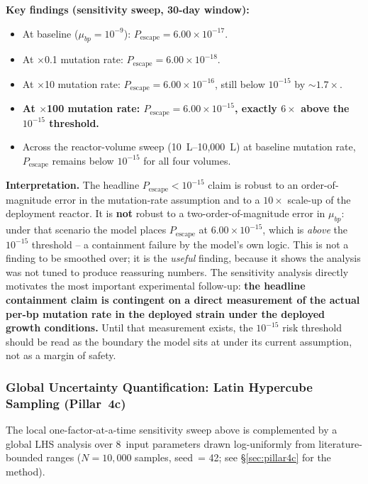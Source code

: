 \documentclass[10pt,twocolumn,letterpaper,
              colorlinks=true,
              linkcolor=blue!70!black,
              citecolor=blue!70!black,
              urlcolor=blue!70!black,
              pdfborder={0 0 0}]{article}
\begin{document}
\textbf{Key findings (sensitivity sweep, 30-day window):}
\begin{itemize}
  \item At baseline ($\mu_{bp} = 10^{-9}$):
        $P_{\text{escape}} = 6.00 \times 10^{-17}$.
  \item At $\times$0.1 mutation rate:
        $P_{\text{escape}} = 6.00 \times 10^{-18}$.
  \item At $\times$10 mutation rate:
        $P_{\text{escape}} = 6.00 \times 10^{-16}$,
        still below $10^{-15}$ by $\sim$$1.7\times$.
  \item \textbf{At $\times$100 mutation rate:
        $P_{\text{escape}} = 6.00 \times 10^{-15}$,
        exactly $6\times$ above the $10^{-15}$ threshold.}
  \item Across the reactor-volume sweep (10~L--10{,}000~L) at baseline
        mutation rate, $P_{\text{escape}}$ remains below $10^{-15}$
        for all four volumes.
\end{itemize}

\textbf{Interpretation.} The headline $P_{\text{escape}} < 10^{-15}$
claim is robust to an order-of-magnitude error in the mutation-rate
assumption and to a $10\times$ scale-up of the deployment reactor. It
is \textbf{not} robust to a two-order-of-magnitude error in $\mu_{bp}$:
under that scenario the model places $P_{\text{escape}}$ at
$6.00 \times 10^{-15}$, which is \textit{above} the $10^{-15}$
threshold -- a containment failure by the model's own logic. This is not
a finding to be smoothed over; it is the \textit{useful} finding,
because it shows the analysis was not tuned to produce reassuring
numbers. The sensitivity analysis directly motivates the most important
experimental follow-up: \textbf{the headline containment claim is
contingent on a direct measurement of the actual per-bp mutation rate in
the deployed strain under the deployed growth conditions.} Until that
measurement exists, the $10^{-15}$ risk threshold should be read as the
boundary the model sits at under its current assumption, not as a margin
of safety.

\subsubsection{Global Uncertainty Quantification: Latin Hypercube
               Sampling (Pillar~4c)}
\label{sec:lhs}

The local one-factor-at-a-time sensitivity sweep above is complemented
by a global LHS analysis over 8~input parameters drawn log-uniformly
from literature-bounded ranges ($N = 10{,}000$ samples, seed~= 42;
see \S\ref{sec:pillar4c} for the method).
\end{document}
